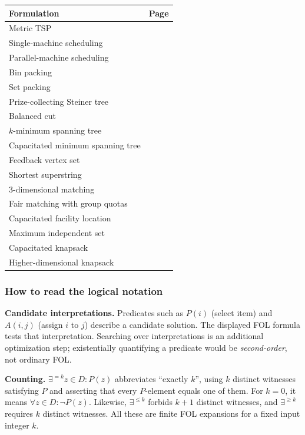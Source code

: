 \documentclass[8pt]{extarticle}
\theoremstyle{definition}
\begin{document}
\begin{multicols*}{2}
\begin{center}
\small\setlength{\tabcolsep}{3pt}
\begin{tabularx}{\linewidth}{@{}Y{1.8}Y{0.2}@{}}
\toprule
\textbf{Formulation} & \textbf{Page}\\\midrule
Metric TSP & \pageref{form:tsp}\\
Single-machine scheduling & \pageref{form:single}\\
Parallel-machine scheduling & \pageref{form:parallel}\\
Bin packing & \pageref{form:bin}\\
Set packing & \pageref{form:setpack}\\
Prize-collecting Steiner tree & \pageref{form:pcst}\\
Balanced cut & \pageref{form:cut}\\
$k$-minimum spanning tree & \pageref{form:kmst}\\
Capacitated minimum spanning tree & \pageref{form:cmst}\\
Feedback vertex set & \pageref{form:fvs}\\
Shortest superstring & \pageref{form:string}\\
3-dimensional matching & \pageref{form:3dm}\\
Fair matching with group quotas & \pageref{form:fair}\\
Capacitated facility location & \pageref{form:facility}\\
Maximum independent set & \pageref{form:independent}\\
Capacitated knapsack & \pageref{form:knapsack}\\
Higher-dimensional knapsack & \pageref{form:multiknapsack}\\
\bottomrule
\end{tabularx}
\end{center}

\subsubsection*{How to read the logical notation}
\textbf{Candidate interpretations.} Predicates such as $P(i)$ (select item)
and $A(i,j)$ (assign $i$ to $j$) describe a candidate solution. The displayed
FOL formula tests that interpretation. Searching over interpretations is
an additional optimization step; existentially quantifying a predicate
would be \emph{second-order}, not ordinary FOL.

\textbf{Counting.} $\exists^{=k}z\in D:P(z)$ abbreviates ``exactly $k$'',
using $k$ distinct witnesses satisfying $P$ and asserting that every
$P$-element equals one of them. For $k=0$, it means $\forall z\in D:\neg P(z)$.
Likewise, $\exists^{\le k}$ forbids $k+1$ distinct witnesses, and
$\exists^{\ge k}$ requires $k$ distinct witnesses. All these are finite
FOL expansions for a fixed input integer $k$.


\end{multicols*}
\end{document}
